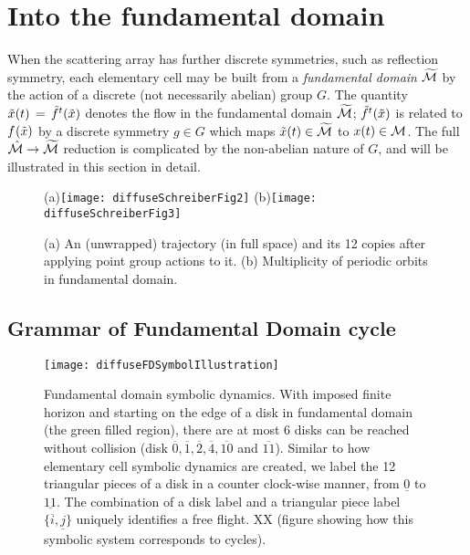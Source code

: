 \documentclass[aps,pre,preprint,groupedaddress,floatfix]{revtex4-1}
\begin{document}
\section{Into the fundamental domain\label{s-SymmetryReduction}
}

 When the scattering array has further discrete symmetries, such as reflection symmetry, each elementary cell may be built from a {\em fundamental domain} ${\widetilde {{\cal M}}}$ by the action of a discrete (not necessarily abelian) group $G$. The quantity $\tilde x(t)\,=\,{\tilde{f}^{t}(\tilde x)}$ denotes the flow in the fundamental domain ${\widetilde {{\cal M}}}$; ${\tilde{f}^{t}(\tilde x)}$ is related to ${f^{}(\tilde x)}$ by a discrete symmetry $g \in G$ which maps $\tilde x(t)\in {\widetilde {\ensuremath{{\cal M}}}}$ to ${x}(t) \in {\ensuremath{{\cal M}}}$. The full $\hat {{\cal M}} \rightarrow {\widetilde {\ensuremath{{\cal M}}}}$ reduction is complicated by the non-abelian nature of $G$, and will be illustrated in this section in detail.


\begin{figure}[htbp]
\begin{center}
(a)\texttt{[image: diffuseSchreiberFig2]}
(b)\texttt{[image: diffuseSchreiberFig3]}
\end{center}
\caption[]{ \label{fig:schrieberFig23}
(a) An (unwrapped) trajectory (in full space) and its 12 copies after applying point group actions to it. (b) Multiplicity of periodic orbits in fundamental domain.}
\end{figure}

\subsection{Grammar of Fundamental Domain cycle}
\begin{figure}[htbp]
\texttt{[image: diffuseFDSymbolIllustration]}
\caption{\label{fig-fdflights} Fundamental domain symbolic dynamics. With imposed finite horizon and starting on the edge of a disk in fundamental domain (the green filled region), there are at most 6 disks can be reached without collision (disk $\overline{0},\overline{1},\overline{2},\overline{4},\overline{10}$ and $\overline{11}$). Similar to how elementary cell symbolic dynamics are created, we label the 12 triangular pieces of a disk in a counter clock-wise manner, from $\underline{0}$ to $\underline{11}$. The combination of a disk label and a triangular piece label $\{\overline{i},\underline{j}\}$ uniquely identifies a free flight. XX (figure showing how this symbolic system corresponds to cycles).}
\end{figure}
\end{document}

